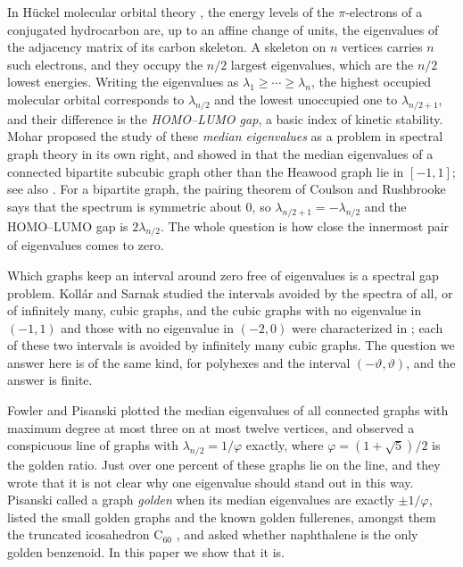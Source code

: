 \documentclass[11pt]{article}
\newcommand\vphi{\varphi}
\newcommand\thetaG{\vartheta}
\theoremstyle{definition}
\begin{document}
In H\"uckel molecular orbital theory \cite{Huckel1931,CDS1995,GutPol1986},
the energy levels of the $\pi$-electrons of a conjugated hydrocarbon are, up
to an affine change of units, the eigenvalues of the adjacency matrix of its
carbon skeleton.  A skeleton on $n$ vertices carries $n$ such electrons, and
they occupy the $n/2$ largest eigenvalues, which are the $n/2$ lowest
energies.  Writing the eigenvalues as
$\lambda_1\ge\cdots\ge\lambda_n$, the highest occupied molecular orbital
corresponds to $\lambda_{n/2}$ and the lowest unoccupied one to
$\lambda_{n/2+1}$, and their difference is the \textsl{HOMO--LUMO gap}, a
basic index of kinetic stability.  Mohar \cite{Mohar2015} proposed the study
of these \textsl{median eigenvalues} as a problem in spectral graph theory in
its own right, and showed in \cite{Mohar2016} that the median eigenvalues
of a connected bipartite subcubic graph other than the Heawood graph lie in
$[-1,1]$;
see also \cite{MohTay2015,GuoMoh2014}.
For a bipartite graph, the pairing theorem of Coulson and Rushbrooke
\cite{CouRus1940} says that the spectrum is symmetric about $0$, so
$\lambda_{n/2+1}=-\lambda_{n/2}$ and the HOMO--LUMO gap is $2\lambda_{n/2}$.
The whole question is how close the innermost pair of eigenvalues comes to
zero.

Which graphs keep an interval around zero free of eigenvalues is a spectral
gap problem.  Koll\'ar and Sarnak \cite{KolSar2021} studied the intervals
avoided by the spectra of all, or of infinitely many, cubic graphs, and the
cubic graphs with no eigenvalue in $(-1,1)$ and those with no eigenvalue in
$(-2,0)$ were characterized in \cite{GuoRoy2024,GuoRoy2025}; each of these
two intervals is avoided by infinitely many cubic graphs.  The question we
answer here is of the same kind, for polyhexes and the interval
$(-\thetaG,\thetaG)$, and the answer is finite.

Fowler and Pisanski \cite{FowPis2010} plotted the median eigenvalues of all
connected graphs with maximum degree at most three on at most twelve vertices,
and observed a conspicuous line of graphs with $\lambda_{n/2}=1/\vphi$
exactly, where $\vphi=(1+\sqrt5)/2$ is the golden ratio.  Just over one
percent of these graphs lie on the line, and they wrote that it is not clear
why one eigenvalue should stand out in this way.  Pisanski \cite{Pis2010}
called a graph \textsl{golden} when its median eigenvalues are exactly
$\pm1/\vphi$, listed the small golden graphs and the known golden fullerenes,
amongst them the truncated icosahedron $\mathrm{C}_{60}$
\cite{FowPis2010b}, and asked whether naphthalene is the only golden
benzenoid.  In this paper we show that it is.
\end{document}
